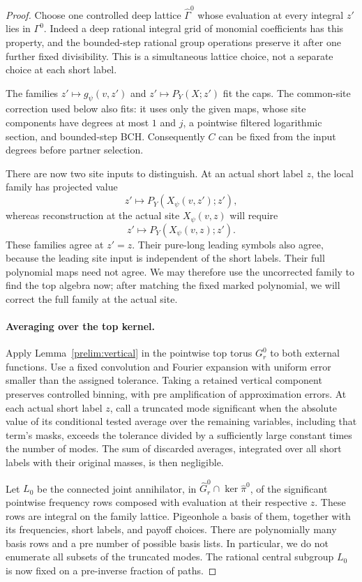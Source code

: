 \begin{proof}
Choose one controlled deep lattice $\widehat\Gamma^0$ whose
evaluation at every integral $z'$ lies in $\Gamma^0$.  Indeed a deep
rational integral grid of monomial coefficients has this property,
and the bounded-step rational group operations preserve it after
one further fixed divisibility.  This is a simultaneous lattice
choice, not a separate choice at each short label.

The families $z'\mapsto g_\psi(v,z')$ and
$z'\mapsto P_Y(X;z')$ fit the caps.  The common-site correction used
below also fits: it uses only the given maps, whose site components
have degrees at most $1$ and $j$, a pointwise filtered logarithmic
section, and bounded-step BCH.  Consequently $C$ can be fixed from
the input degrees before partner selection.

There are now two site inputs to distinguish.  At an actual short
label $z$, the local family has projected value
\[
 z'\longmapsto P_Y(X_\psi(v,z');z'),
\]
whereas reconstruction at the actual site $X_\psi(v,z)$ will require
\[
 z'\longmapsto P_Y(X_\psi(v,z);z').
\]
These families agree at $z'=z$.  Their pure-long leading symbols
also agree, because the leading site input is independent of the short
labels.  Their full polynomial maps need not agree.  We may therefore
use the uncorrected family to find the top algebra now; after matching
the fixed marked polynomial, we will correct the full family at the
actual site.

\paragraph{Averaging over the top kernel.}
Apply Lemma~\ref{prelim:vertical} in the pointwise top torus $G^0_r$
to both external functions.  Use a fixed convolution and Fourier
expansion with uniform error smaller than the assigned tolerance.
Taking a retained vertical component preserves controlled binning,
with pre amplification of approximation errors.  At each actual
short label $z$, call a truncated mode significant when the
absolute value of its conditional tested average over the remaining
variables, including that term's masks, exceeds the tolerance
divided by a sufficiently large constant times the number of modes.
The sum of discarded averages, integrated over all short labels
with their original masses, is then negligible.

Let $L_0$ be the connected joint annihilator, in
$\widehat G^0_r\cap\ker\widehat\pi^0$, of the significant pointwise
frequency rows composed with evaluation at their respective $z$.
These rows are integral on the family lattice.  Pigeonhole a basis
of them, together with its frequencies, short labels, and payoff
choices.  There are polynomially many basis rows and a pre number
of possible basis lists.  In particular, we do not enumerate all
subsets of the truncated modes.  The rational central subgroup
$L_0$ is now fixed on a pre-inverse fraction of paths.


\end{proof}
